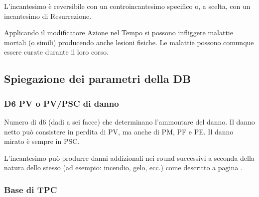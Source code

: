 L'incantesimo \`e reversibile con un controincantesimo specifico o, a
scelta, con un incantesimo di Resurrezione.

Applicando il modificatore Azione nel Tempo si possono infliggere
malattie mortali (o simili) producendo anche lesioni fisiche. Le
malattie possono comunque essere curate durante il loro corso.




\bigskip


{\raggedright \subsection{Spiegazione dei parametri della DB}}

\subsubsection{D6 PV o PV/PSC di danno} 

Numero di d6 (dadi a sei facce) che determinano l'ammontare del danno.
Il danno netto pu\`o consistere in perdita di PV, ma anche di PM, PF e
PE. Il danno mirato \`e sempre in PSC.

L'incantesimo pu\`o produrre danni addizionali nei round successivi
a seconda della natura dello stesso (ad esempio: incendio, gelo, ecc.)
come descritto a pagina \pageref{danniaddizionali}.

\subsubsection{Base di TPC} 

